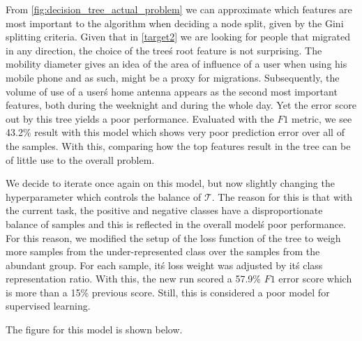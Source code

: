 
\smallskip


From \cref{fig:decision_tree_actual_problem} we can approximate which features are most important to the algorithm when deciding a node split, given by the Gini splitting criteria.
Given that in \cref{target2} we are looking for people that migrated in any direction, the choice of the tree\'s root feature is not surprising.
The mobility diameter gives an idea of the area of influence of a user when using his mobile phone and as such, might be a proxy for migrations.
Subsequently, the volume of use of a user\'s home antenna appears as the second most important features, both during the weeknight and during the whole day.
Yet the error score out by this tree yields a poor performance. Evaluated with the $F1$ metric, we see 43.2\% result with this model which shows very poor prediction error over all of the samples.
With this, comparing how the top features result in the tree can be of little use to the overall problem.

We decide to iterate once again on this model, but now slightly changing the hyperparameter which controls the balance of $\mathcal{T}$.
The reason for this is that with the current task, the positive and negative classes have a disproportionate balance of samples and this is reflected in the overall model\'s poor performance.
For this reason, we modified the setup of the loss function of the tree to weigh more samples from the under-represented class over the samples from the abundant group.
For each sample, it\'s loss weight was adjusted by it\'s class representation ratio.
With this, the new run scored a 57.9\% $F1$ error score which is more than a 15\% previous score.
Still, this is considered a poor model for supervised learning.

The figure for this model is shown below.

\bigskip

